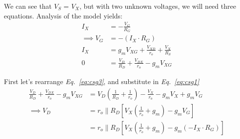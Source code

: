 \documentclass[12pt, fleqn]{article}
\begin{document}
\begin{enumerate}[label=(\alph*)]
    We can see that $V_S$ = $V_X$, but with two unknown voltages, we will need three equations.  Analysis of the model yields:
    \begin{align}
        I_X &= -\frac{V_G}{R_G}\\[0.25cm]
        \implies V_G  &= -(I_X \cdot R_G)
        \label{eq:csg1}\\[0.25cm]
        I_X &= g_m V_{XG} + \frac{V_{XD}}{r_o} + \frac{V_X}{R_S}
        \label{eq:csg2}\\[0.25cm]
        0 &= \frac{V_D}{R_D} + \frac{V_{DX}}{r_o} - g_m V_{XG}
        \label{eq:csg3}
    \end{align}

    First let's rearrange \textit{Eq.~\ref{eq:csg3}}, and substitute in \textit{Eq.~\ref{eq:csg1}}
    \begin{align}
        \frac{V_D}{R_D} + \frac{V_{DX}}{r_o} - g_m V_{XG}
        &= V_D\left(\frac{1}{R_D} + \frac{1}{r_o}\right) - \frac{V_X}{r_o} - g_m V_X + g_m V_G\\[0.25cm]
        \implies V_D &= r_o \parallel R_D \left[V_X\left(\frac{1}{r_o} + g_m\right) - g_m V_G\right]\\[0.25cm]
        &= r_o \parallel R_D \left[V_X\left(\frac{1}{r_o} + g_m\right) - g_m (-I_X \cdot R_G)\right]
        \label{eq:csg4}
    \end{align}

\newpage


\end{enumerate}
\end{document}
